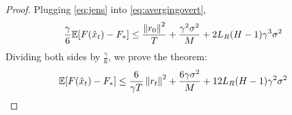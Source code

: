 \begin{proof}
    Plugging \eqref{eq:jens} into \eqref{eq:avergingovert},
    \begin{align}
        \begin{split}
            \frac{\gamma}{6} \mathbb{E} [F(\hat{x}_t) - F_*]
            &\leq \frac{\left\|r_0\right\|^2}{T}
            + \frac{\gamma^2 \sigma^2}{M}
            + 2 L_R (H-1) \gamma^3 \sigma^2
        \end{split}
    \end{align}
    Dividing both sides by $\frac{\gamma}{6}$, we prove the theorem:
    \begin{align}
        \begin{split}
            \mathbb{E} [F(\hat{x}_t) - F_*]
            &\leq \frac{6}{ \gamma T} \left\|r_t\right\|^2
            + \frac{6 \gamma \sigma^2}{M}
            + 12 L_R (H-1) \gamma^2 \sigma^2
        \end{split}
    \end{align}
\end{proof}